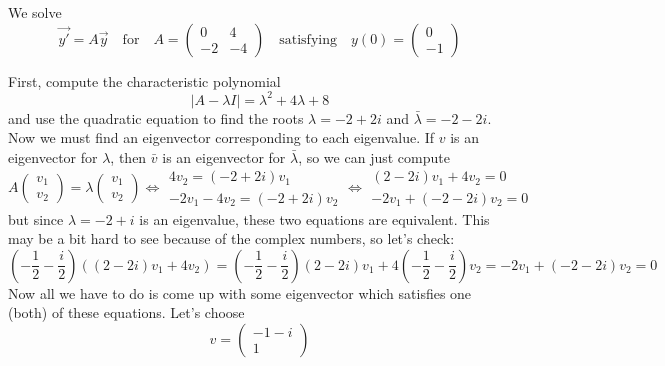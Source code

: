 \documentclass[11pt]{article}
\begin{document}

We solve 
\[\vec{y'} = A \vec{y}\quad\mathrm{for}\quad A = \left(
\begin{array}{cc}
 0 & 4 \\
 -2 & -4
\end{array}
\right) \quad\mathrm{satisfying}\quad y(0) = \left( \begin{matrix} 0 \\-1 \end{matrix} \right) \]

First, compute the characteristic polynomial
\[|A - \lambda I | = \lambda ^2+4 \lambda +8\]
and use the quadratic equation to find the roots $ \lambda =  -2+2 i $ and $ \bar{\lambda} = -2-2 i$. Now we must find an eigenvector corresponding to each eigenvalue. If $v$ is an eigenvector for $\lambda$, then $\bar{v}$ is an eigenvector for $\bar{\lambda}$, so we can just compute 
\[A \left( \begin{matrix} v_1 \\ v_2 \end{matrix} \right) = \lambda  \left( \begin{matrix} v_1 \\ v_2 \end{matrix} \right) \iff \begin{matrix} 4 v_2 = (-2 + 2i) v_1 \\ -2 v_1 -4 v_2 = (-2+2i) v_2 \end{matrix}  \iff \begin{matrix} (2 - 2i) v_1 + 4 v_2=0 \\ -2 v_1  +(-2-2i) v_2 =0\end{matrix} \]
but since $\lambda = -2 + i$ is an eigenvalue, these two equations are equivalent. This may be a bit hard to see because of the complex numbers, so let's check:
\[\left(-\frac{1}{2} - \frac{i}{2}\right) \left((2 - 2i) v_1 + 4 v_2 \right)  =
\left(-\frac{1}{2} - \frac{i}{2}\right) (2 - 2i) v_1 + 4 \left(-\frac{1}{2} - \frac{i}{2}\right)  v_2   = -2 v_1  +(-2-2i) v_2 =0  \]
Now all we have to do is come up with some eigenvector which satisfies one (both) of these equations. Let's choose 
\[v = \left(
\begin{array}{c}
 -1-i \\
 1
\end{array}
\right)\]
\end{document}
